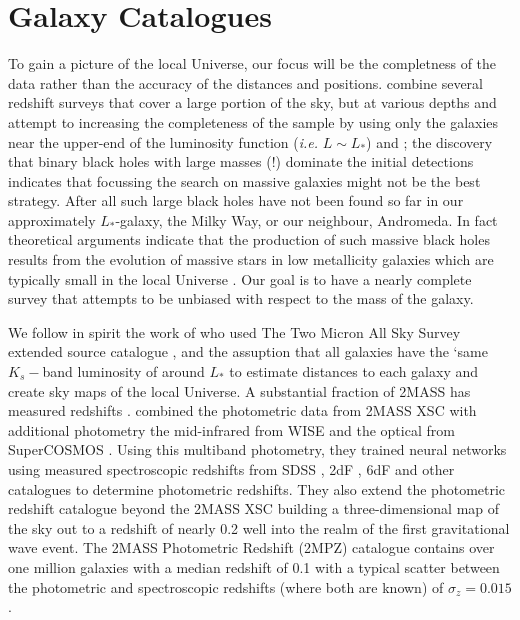 \documentclass[useAMS,usenatbib]{mn2e}
\begin{document}
\section{Galaxy Catalogues}

To gain a picture of the local Universe, our focus will be the
completness of the data rather than the accuracy of the distances and
positions.  \citet{2015arXiv150803608G} combine several redshift
surveys
\citep[e.g.][]{2002MNRAS.336..907N,2003MNRAS.344..307L,2005MNRAS.360...81D,
  2012ApJS..199...26H} that cover a large portion of the sky, but at
various depths and attempt to increasing the completeness of the
sample by using only the galaxies near the upper-end of the luminosity
function ({\em i.e.}  $L\sim L_*$) and ; the discovery that binary
black holes with large masses (!)  dominate the initial detections
indicates that focussing the search on massive galaxies might not be
the best strategy.  After all such large black holes have not been
found so far in our approximately $L_*$-galaxy, the Milky Way, or our
neighbour, Andromeda.  In fact theoretical arguments indicate that the
production of such massive black holes results from the evolution of
massive stars in low metallicity galaxies
\citep{2016ApJ...818L..22A,2016arXiv160203790E} which are typically
small in the local Universe \citep[e.g.][]{1997MNRAS.285..613H}. Our
goal is to have a nearly complete survey that attempts to be unbiased
with respect to the mass of the galaxy.

We follow in spirit the work of \citet{2004PASA...21..396J} who used
The Two Micron All Sky Survey extended source catalogue \citep[2MASS
  XSC,][]{2000AJ....119.2498J,2006AJ....131.1163S}, and the assuption
that all galaxies have the `same $K_s-$band luminosity of around $L_*$
to estimate distances to each galaxy and create sky maps of the local
Universe.  A substantial fraction of 2MASS has measured redshifts
\citep[e.g][]{2012ApJS..199...26H}.  \citet{2014ApJS..210....9B}
combined the photometric data from 2MASS XSC with additional
photometry the mid-infrared from WISE \citep{2010AJ....140.1868W} and
the optical from SuperCOSMOS
\citep{2001MNRAS.326.1315H,2001MNRAS.326.1295H,2001MNRAS.326.1279H}.
Using this multiband photometry, they trained neural networks using
measured spectroscopic redshifts from SDSS
\citep{2012ApJS..203...21A,2014ApJS..211...17A}, 2dF
\citep{2001MNRAS.328.1039C,2003astro.ph..6581C}, 6dF
\citep{2004MNRAS.355..747J,2009MNRAS.399..683J} and other catalogues
to determine photometric redshifts.  They also extend the photometric
redshift catalogue beyond the 2MASS XSC building a three-dimensional
map of the sky out to a redshift of nearly 0.2 well into the realm of
the first gravitational wave event.  The 2MASS Photometric Redshift
(2MPZ) catalogue contains over one million galaxies with a median
redshift of 0.1 with a typical scatter between the
photometric and spectroscopic redshifts (where both are known) of
$\sigma_z = 0.015$.
\end{document}
